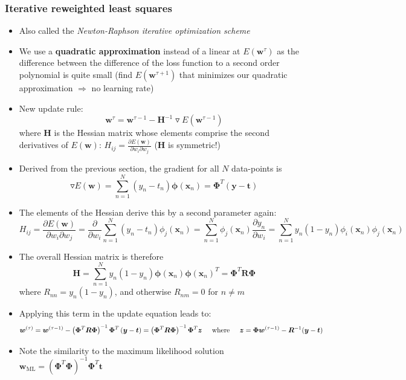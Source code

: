 \subsubsection{Iterative reweighted least squares}
\begin{itemize}
	\item Also called the \textit{Newton-Raphson iterative optimization scheme}
	\item We use a \textbf{quadratic approximation} instead of a linear at $E(\bm{w}^{\tau})$ as the difference between the difference of the loss function to a second order polynomial is quite small (find $E(\bm{w}^{\tau+1})$ that minimizes our quadratic approximation $\Rightarrow$ no learning rate)
	\item New update rule: $$\bm{w}^{\tau} = \bm{w}^{\tau-1} - \bm{H}^{-1} \triangledown E(\bm{w}^{\tau - 1})$$ where $\bm{H}$ is the Hessian matrix whose elements comprise the second derivatives of $E(\bm{w})$: $H_{ij}=\frac{\partial E(\bm{w})}{\partial w_i \partial w_j}$ ($\bm{H}$ is symmetric!)
	\item Derived from the previous section, the gradient for all $N$ data-points is 
	$$\triangledown E(\bm{w}) = \sum\limits_{n=1}^{N} (y_n - t_n)\bm{\phi}\left(\bm{x}_n\right) = \bm{\Phi}^T\left(\bm{y} - \bm{t}\right)$$
	\item The elements of the Hessian derive this by a second parameter again:
	$$H_{ij} = \frac{\partial E(\bm{w})}{\partial w_i \partial w_j} = \frac{\partial}{\partial w_i}\sum\limits_{n=1}^{N} (y_n - t_n)\phi_j \left(\bm{x}_n\right) = \sum\limits_{n=1}^{N} \phi_j\left(\bm{x}_n\right) \frac{\partial y_n}{\partial w_i} = \sum\limits_{n=1}^{N} y_n (1 - y_n) \phi_i(\bm{x}_n)\phi_j(\bm{x}_n)$$
	\item The overall Hessian matrix is therefore 
	$$\bm{H} = \sum\limits_{n=1}^{N} y_n (1 - y_n) \bm{\phi}(\bm{x}_n)\bm{\phi}(\bm{x}_n)^T = \bm{\Phi}^T \bm{R}\bm{\Phi}$$
	where $R_{nn} = y_n(1-y_n)$, and otherwise $R_{nm} = 0$ for $n\neq m$
	\item Applying this term in the update equation leads to:
	$$\bm{w}^{(\tau)} = \bm{w}^{(\tau - 1)} - \left(\bm{\Phi}^T \bm{R} \bm{\Phi}\right)^{-1}\bm{\Phi}^T\left(\bm{y} - \bm{t}\right) = \left(\bm{\Phi}^T \bm{R} \bm{\Phi}\right)^{-1} \bm{\Phi}^T \bm{z} \text{\hspace{5mm}where\hspace{5mm}} \bm{z} = \bm{\Phi}\bm{w}^{(\tau-1)}-\bm{R}^{-1}(\bm{y}-\bm{t})$$
	\item Note the similarity to the maximum likelihood solution $\bm{w}_{\text{ML}} = \left(\bm{\Phi}^T \bm{\Phi}\right)^{-1} \bm{\Phi}^T\bm{t}$

\end{itemize}
